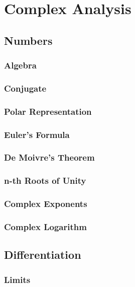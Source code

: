 \chapter{Complex Analysis}

\section{Numbers}

\subsection{Algebra}

\subsection{Conjugate}

\subsection{Polar Representation}

\subsection{Euler's Formula}

\subsection{De Moivre's Theorem}

\subsection{n-th Roots of Unity}

\subsection{Complex Exponents}

\subsection{Complex Logarithm}


\newpage
\section{Differentiation}

\subsection{Limits}

